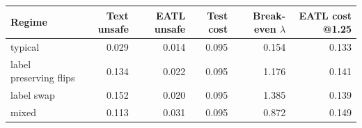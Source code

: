 \begin{tabular}{lrrrrr}
\toprule
Regime & Text unsafe & EATL unsafe & Test cost & Break-even $\lambda$ & EATL cost @1.25 \\
\midrule
typical & 0.029 & 0.014 & 0.095 & 0.154 & 0.133 \\
label preserving flips & 0.134 & 0.022 & 0.095 & 1.176 & 0.141 \\
label swap & 0.152 & 0.020 & 0.095 & 1.385 & 0.139 \\
mixed & 0.113 & 0.031 & 0.095 & 0.872 & 0.149 \\
\bottomrule
\end{tabular}
